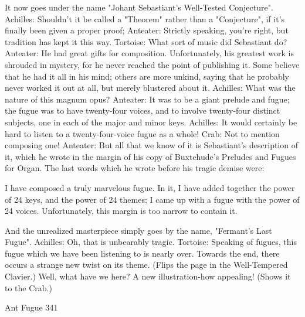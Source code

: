         It now goes under the name "Johant Sebastiant's Well-Tested Conjecture".
   Achilles: Shouldn't it be called a "Theorem" rather than a "Conjecture", if it's finally been
        given a proper proof;
   Anteater: Strictly speaking, you're right, but tradition has kept it this way.
   Tortoise: What sort of music did Sebastiant do?
   Anteater: He had great gifts for composition. Unfortunately, his greatest work is shrouded
        in mystery, for he never reached the point of publishing it. Some believe that he had
        it all in his mind; others are more unkind, saying that he probably never worked it out
        at all, but merely blustered about it.
   Achilles: What was the nature of this magnum opus?
   Anteater: It was to be a giant prelude and fugue; the fugue was to have
        twenty-four voices, and to involve twenty-four distinct subjects, one in
        each of the major and minor keys.
   Achilles: It would certainly be hard to listen to a twenty-four-voice fugue
        as a whole!
   Crab: Not to mention composing one!
Anteater: But all that we know of it is Sebastiant's description of it, which he wrote in the
   margin of his copy of Buxtehude's Preludes and Fugues for Organ. The last words which
   he wrote before his tragic demise were:

                I have composed a truly marvelous fugue. In it, I have added
                together the power of 24 keys, and the power of 24 themes; I
                came up with a fugue with the power of 24 voices. Unfortunately,
                this margin is too narrow to contain it.

        And the unrealized masterpiece simply goes by the name, "Fermant's Last Fugue".
    Achilles: Oh, that is unbearably tragic.
    Tortoise: Speaking of fugues, this fugue which we have been listening to is nearly over.
        Towards the end, there occurs a strange new twist on its theme. (Flips the page in the
        Well-Tempered Clavier.) Well, what have we here? A new illustration-how
        appealing! (Shows it to the Crab.)




    Ant Fugue                                                                               341


